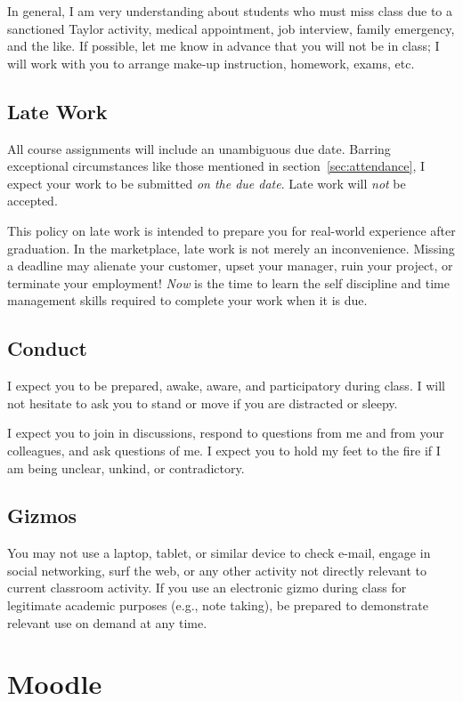 \documentclass[11pt]{article}
\begin{document}
In general, I am very understanding about students who must miss class
due to a sanctioned Taylor activity, medical appointment, job interview,
family emergency, and the like.
If possible, let me know in advance that you will not be in class;
I will work with you to arrange make-up instruction, homework, exams, etc.

\subsection{Late Work}

All course assignments will include an unambiguous due date.
Barring exceptional circumstances like those mentioned in section~\ref{sec:attendance},
I expect your work to be submitted \emph{on the due date}.
Late work will \emph{not} be accepted.

This policy on late work is intended to prepare you
for real-world experience after graduation.
In the marketplace,
late work is not merely an inconvenience.
Missing a deadline may
alienate your customer,
upset your manager,
ruin your project,
or terminate your employment!
\emph{Now} is the time to learn the self discipline and time management skills
required to complete your work when it is due.

\subsection{Conduct}

I expect you to be prepared, awake, aware, and participatory during class. I will not
hesitate to ask you to stand or move if you are distracted or sleepy.

I expect you to join in discussions, respond to questions from me and from your
colleagues, and ask questions of me. I expect you to hold my feet to the fire if I am
being unclear, unkind, or contradictory.

\subsection{Gizmos}

You may not use a laptop, tablet, or similar device to check e-mail, engage in social
networking, surf the web, or any other activity not directly relevant
to current classroom activity.
If you use an electronic gizmo during class for legitimate academic purposes
(e.g., note taking), be prepared to demonstrate relevant use on demand
at any time.

\section{Moodle}
\end{document}
